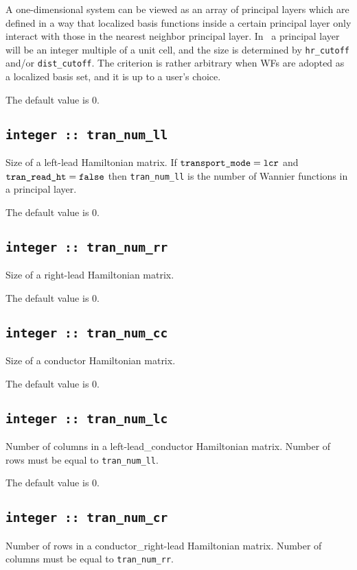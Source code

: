 A one-dimensional system can be viewed
as an array of principal layers
which are defined in a way that
localized basis functions inside a certain principal layer
only interact with those in the nearest neighbor principal layer.
In \wannier\ a principal layer will be an integer multiple
of a unit cell, and the size is determined by
\verb#hr_cutoff# and/or \verb#dist_cutoff#.
The criterion is rather arbitrary
when WFs are adopted as a localized basis set, 
and it is up to a user's choice.

The default value is 0.

\subsection[tran\_num\_ll]{\tt integer :: tran\_num\_ll}
Size of a left-lead Hamiltonian matrix. 
If $\verb#transport_mode# = \verb#lcr#$ and 
$\verb#tran_read_ht# = \verb#false#$ then 
\verb#tran_num_ll# is the number of Wannier functions
in a principal layer.

The default value is 0.

\subsection[tran\_num\_rr]{\tt integer :: tran\_num\_rr}
Size of a right-lead Hamiltonian matrix.

The default value is 0.

\subsection[tran\_num\_cc]{\tt integer :: tran\_num\_cc}
Size of a conductor Hamiltonian matrix.

The default value is 0.

\subsection[tran\_num\_lc]{\tt integer :: tran\_num\_lc}
Number of columns in a left-lead\_conductor Hamiltonian matrix.
Number of rows must be equal to \verb#tran_num_ll#.
 

The default value is 0.

\subsection[tran\_num\_cr]{\tt integer :: tran\_num\_cr}
Number of rows in a conductor\_right-lead Hamiltonian matrix.
Number of columns must be equal to \verb#tran_num_rr#.

